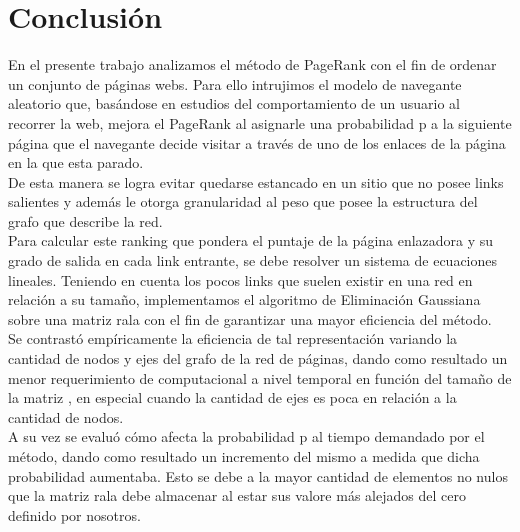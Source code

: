 \section{Conclusión}

En el presente trabajo analizamos el método de PageRank con el fin de ordenar un conjunto de páginas webs. Para ello intrujimos el modelo de navegante aleatorio que, basándose en estudios del comportamiento de un usuario al recorrer la web, mejora el PageRank al asignarle una probabilidad p a la siguiente página que el navegante decide visitar a través de uno de los enlaces de la página en la que esta parado.\\
De esta manera se logra evitar quedarse estancado en un sitio que no posee links salientes y además le otorga granularidad al peso que posee la estructura del grafo que describe la red.\\
Para calcular este ranking que pondera el puntaje de la página enlazadora y su grado de salida en cada link entrante, se debe resolver un sistema de ecuaciones lineales. Teniendo en cuenta los pocos links que suelen existir en una red en relación a su tamaño, implementamos el algoritmo de Eliminación Gaussiana sobre una matriz rala con el fin de garantizar una mayor eficiencia del método.\\

Se contrastó empíricamente la eficiencia de tal representación variando la cantidad de nodos y ejes del grafo de la red de páginas, dando como resultado un menor requerimiento de computacional a nivel temporal en función del tamaño de la matriz , en especial cuando la cantidad de ejes es poca en relación a la cantidad de nodos. \\
A su vez se evaluó cómo afecta la probabilidad p al tiempo demandado por el método, dando como resultado un incremento del mismo a medida que dicha probabilidad aumentaba. Esto se debe a la mayor cantidad de elementos no nulos que la matriz rala debe almacenar al estar sus valore más alejados del cero definido por nosotros. \\

